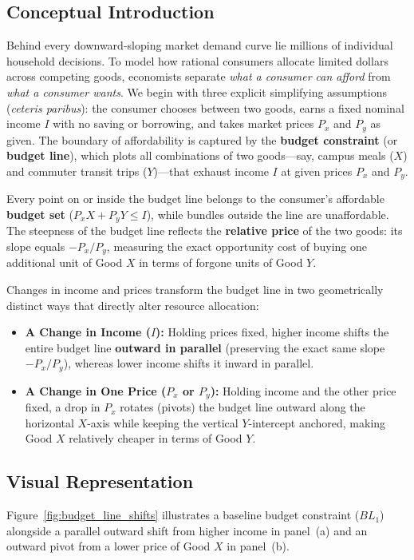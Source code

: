 \documentclass[11pt,letterpaper]{article}
\begin{document}
\subsection*{Conceptual Introduction}
Behind every downward-sloping market demand curve lie millions of individual household decisions. To model how rational consumers allocate limited dollars across competing goods, economists separate \emph{what a consumer can afford} from \emph{what a consumer wants}. We begin with three explicit simplifying assumptions (\emph{ceteris paribus}): the consumer chooses between two goods, earns a fixed nominal income $I$ with no saving or borrowing, and takes market prices $P_x$ and $P_y$ as given. The boundary of affordability is captured by the \textbf{budget constraint} (or \textbf{budget line}), which plots all combinations of two goods—say, campus meals ($X$) and commuter transit trips ($Y$)—that exhaust income $I$ at given prices $P_x$ and $P_y$.

Every point on or inside the budget line belongs to the consumer's affordable \textbf{budget set} ($P_x X + P_y Y \le I$), while bundles outside the line are unaffordable. The steepness of the budget line reflects the \textbf{relative price} of the two goods: its slope equals $-P_x / P_y$, measuring the exact opportunity cost of buying one additional unit of Good $X$ in terms of forgone units of Good $Y$.

Changes in income and prices transform the budget line in two geometrically distinct ways that directly alter resource allocation:
\begin{itemize}
    \item \textbf{A Change in Income ($I$):} Holding prices fixed, higher income shifts the entire budget line \textbf{outward in parallel} (preserving the exact same slope $-P_x / P_y$), whereas lower income shifts it inward in parallel.
    \item \textbf{A Change in One Price ($P_x$ or $P_y$):} Holding income and the other price fixed, a drop in $P_x$ rotates (pivots) the budget line outward along the horizontal $X$-axis while keeping the vertical $Y$-intercept anchored, making Good $X$ relatively cheaper in terms of Good $Y$.
\end{itemize}

\subsection*{Visual Representation}
Figure~\ref{fig:budget_line_shifts} illustrates a baseline budget constraint ($BL_1$) alongside a parallel outward shift from higher income in panel~(a) and an outward pivot from a lower price of Good $X$ in panel~(b).
\end{document}
